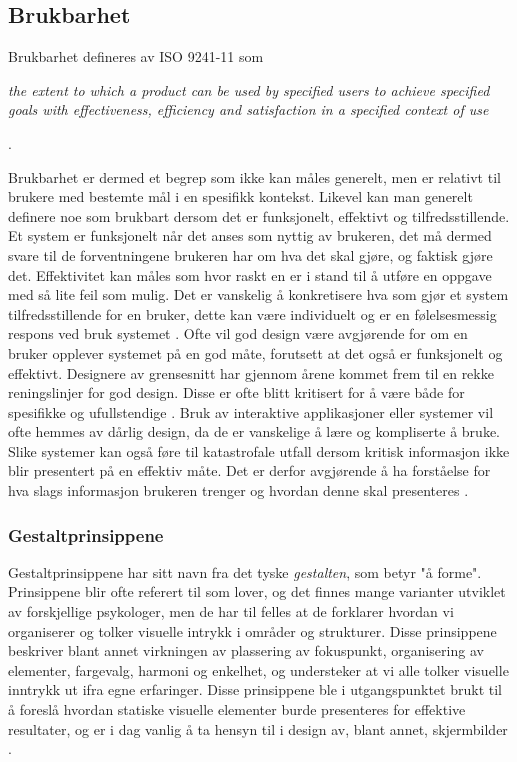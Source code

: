 \subsection{Brukbarhet}
\label{chp: brukbarhet}

Brukbarhet defineres av ISO 9241-11 som

\noindent
\begin{otherlanguage}{english}
\emph{the extent to which a product can be used by specified users to achieve specified goals with effectiveness, efficiency and satisfaction in a specified context of use}
\end{otherlanguage}
 \cite{Svanes08}.

\noindent
Brukbarhet er dermed et begrep som ikke kan måles generelt, men er relativt til brukere med bestemte mål i en spesifikk kontekst. Likevel kan man generelt definere noe som brukbart dersom det er funksjonelt, effektivt og tilfredsstillende. Et system er funksjonelt når det anses som nyttig av brukeren, det må dermed svare til de forventningene brukeren har om hva det skal gjøre, og faktisk gjøre det. Effektivitet kan måles som hvor raskt en er i stand til å utføre en oppgave med så lite feil som mulig. Det er vanskelig å konkretisere hva som gjør et system tilfredsstillende for en bruker, dette kan være individuelt og er en følelsesmessig respons ved bruk systemet \cite{Kuniavsky}. Ofte vil god design være avgjørende for om en bruker opplever systemet på en god måte, forutsett at det også er funksjonelt og effektivt. Designere av grensesnitt har gjennom årene kommet frem til en rekke reningslinjer for god design. Disse er ofte blitt kritisert for å være både for spesifikke og ufullstendige \cite{mmi}. Bruk av interaktive applikasjoner eller systemer vil ofte hemmes av dårlig design, da de er vanskelige å lære og kompliserte å bruke. Slike systemer kan også føre til katastrofale utfall dersom kritisk informasjon ikke blir presentert på en effektiv måte. Det er derfor avgjørende å ha forståelse for hva slags informasjon brukeren trenger og hvordan denne skal presenteres \cite{Ebright10}. 

\subsubsection{Gestaltprinsippene}
Gestaltprinsippene har sitt navn fra det tyske \emph{gestalten}, som betyr "å forme". Prinsippene blir ofte referert til som lover, og det finnes mange varianter utviklet av forskjellige psykologer, men de har til felles at de forklarer hvordan vi organiserer og tolker visuelle intrykk i områder og strukturer. Disse prinsippene beskriver blant annet virkningen av plassering av fokuspunkt, organisering av elementer, fargevalg, harmoni og enkelhet, og understeker at vi alle tolker visuelle inntrykk ut ifra egne erfaringer. 
Disse prinsippene ble i utgangspunktet brukt til å foreslå hvordan statiske visuelle elementer burde presenteres for effektive resultater\cite{Chang02}, og er i dag vanlig å ta hensyn til i design av, blant annet, skjermbilder \cite{Chang02}. 

